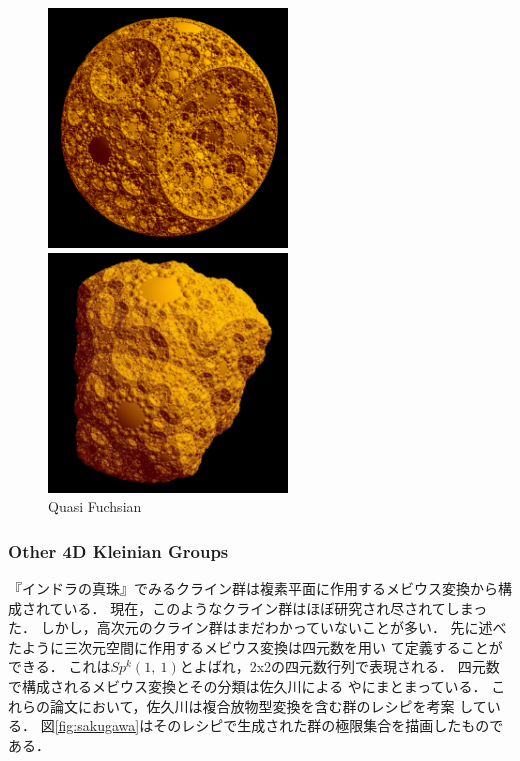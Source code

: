 \begin{figure}[htbp]
 \begin{minipage}{0.49\hsize}
  \center
  \includegraphics[width=2.5in, height=2.5in, keepaspectratio]{../img/klein/quasi-fuchsian.pdf}
  \subcaption{}
 \end{minipage}
 \hspace*{\fill}
 \begin{minipage}{0.49\hsize}
  \center
  \includegraphics[width=2.5in, height=2.5in, keepaspectratio]{../img/klein/quasi-fuchsian2.pdf}
  \subcaption{}
 \end{minipage}
 \caption{Quasi Fuchsian}
 \label{fig:quasiFuchsian}
\end{figure}

\subsubsection{Other 4D Kleinian Groups}

『インドラの真珠』でみるクライン群は複素平面に作用するメビウス変換から構成されている．
現在，このようなクライン群はほぼ研究され尽されてしまった．
しかし，高次元のクライン群はまだわかっていないことが多い．
先に述べたように三次元空間に作用するメビウス変換は四元数を用い
て定義することができる．
これは$Sp^k(1,~1)$とよばれ，2x2の四元数行列で表現される．
四元数で構成されるメビウス変換とその分類は佐久川による
\cite{sakugawa2007master}や\cite{sakugawa2009accidental}にまとまっている．
これらの論文において，佐久川は複合放物型変換を含む群のレシピを考案
している．
図\ref{fig:sakugawa}はそのレシピで生成された群の極限集合を描画したものである．

